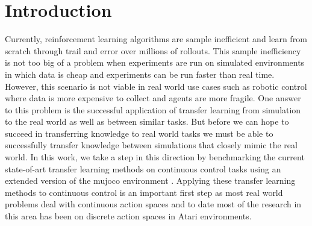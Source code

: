 \section{Introduction}
Currently, reinforcement learning algorithms are sample inefficient and
learn from scratch through trail and error over millions of rollouts.
This sample inefficiency is not too big of a problem when experiments
are run on simulated environments in which data is cheap and experiments
can be run faster than real time. However, this scenario is not viable
in real world use cases such as robotic control where data is more
expensive to collect and agents are more fragile. One answer to this problem
is the successful application of transfer learning from simulation to the real world
as well as between similar tasks. But before we can hope to succeed in transferring
knowledge to real world tasks we must be able to successfully transfer knowledge
between simulations that closely mimic the real world. In this work, we take a step in this
direction by benchmarking the current state-of-art transfer learning methods
on continuous control tasks using an extended version of the mujoco environment
\cite{four}. Applying these transfer learning methods to continuous control is
an important first step as most real world problems deal with continuous action
spaces and to date most of the research in this area has been on discrete action spaces
in Atari environments.
